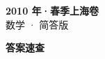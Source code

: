 \documentclass[zihao=-4, a4paper]{ctexart}
\begin{document}
\begin{center}
  {\Large\bfseries 2010 年·春季上海卷}\\[4pt]
  {\large 数学 · 简答版}
\end{center}
\medskip
{}

\clearpage
{}
\begin{center}{\Large\bfseries 答案速查}\end{center}
\medskip

\end{document}
